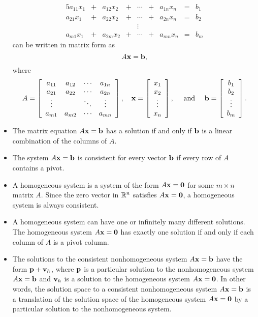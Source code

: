\begin{itemize}
\begin{alignat*}{5}
{a_{11}}x_1 	&{}+{} 	&{a_{12}}x_2 	&{}+{}	&\cdots 			&{}+{}	&{a_{1n}}x_n		&{}={}	&b_1 \\
{a_{21}}x_1 	&{}+{} 	&{a_{22}}x_2		&{}+{}	&\cdots			&{}+{}	&{a_{2n}}x_n		&{}={}	&b_2 \\
{} 				&{} 		&{}					&{}		&\vdots \ \		&{}		&{}					&{}		&{} \\
{a_{m1}}x_1 	&{}+{} 	&{a_{2m}}x_2	&{}+{}	&\cdots			&{}+{}	&{a_{mn}}x_n	&{}={}	&b_m 
\end{alignat*} 
can be written in matrix form as
\[A \mathbf{x} = \mathbf{b},\]
where
\[A = \left[ \begin{array}{cccc}
a_{11} & a_{12} & \cdots & a_{1n} \\
a_{21} & a_{22} & \cdots & a_{2n} \\
\vdots &        & \ddots    & \vdots \\
a_{m1} & a_{m2} & \cdots & a_{mn}
\end{array} \right],  \ \ \ \mathbf{x} = \left[ \begin{array}{c} x_1 \\ x_2 \\ \vdots \\ x_n \end{array} \right],  \ \ \ \text{ and } \ \ \ \mathbf{b} = \left[ \begin{array}{c} b_1 \\ b_2 \\ \vdots \\ b_m \end{array} \right].\]
\item The matrix equation $A \mathbf{x} = \mathbf{b}$ has a solution if and only if $\mathbf{b}$ is a linear combination of the columns of $A$.
\item The system $A \mathbf{x} = \mathbf{b}$ is consistent for every vector $\mathbf{b}$ if every row of $A$ contains a pivot. 
\item A homogeneous system is a system of the form $A \mathbf{x} = \mathbf{0}$ for some $m \times n$ matrix $A$. Since the zero vector in $\mathbb{R}^n$ satisfies $A \mathbf{x} = \mathbf{0}$, a homogeneous system is always consistent.
\item A homogeneous system can have one or infinitely many different solutions. The homogeneous system $A \mathbf{x} = \mathbf{0}$ has exactly one solution if and only if each column of $A$ is a pivot column.
\item The solutions to the consistent nonhomogeneous system $A \mathbf{x} = \mathbf{b}$ have the form $\mathbf{p} + \mathbf{v}_h$, where $\mathbf{p}$ is a particular solution to the nonhomogeneous system $A \mathbf{x} = \mathbf{b}$ and $\mathbf{v}_h$ is a solution to the homogeneous system $A \mathbf{x} = \mathbf{0}$. In other words, the solution space to a consistent nonhomogeneous system $A \mathbf{x} = \mathbf{b}$ is a translation of the solution space of the homogeneous system $A \mathbf{x} = \mathbf{0}$ by a particular solution to the nonhomogeneous system.
\end{itemize}

